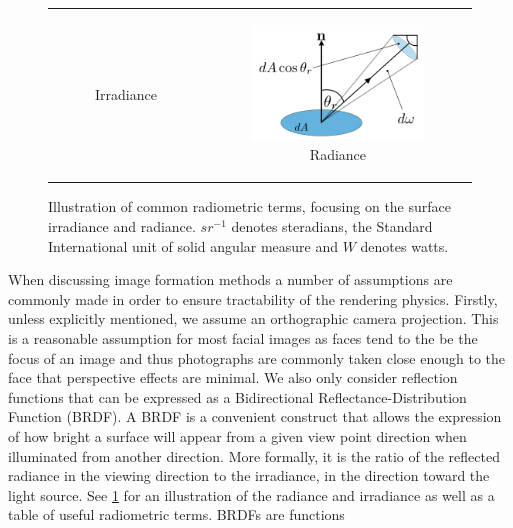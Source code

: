 \begin{figure}[t]
\begin{tabular}{cc}
\begin{subfigure}[b]{0.48\textwidth}
			\caption*{Irradiance}
		\end{subfigure} &
		\begin{subfigure}[b]{0.48\textwidth}
			\centering
			\includegraphics[width=\textwidth]{background/images/radiance}
			\caption*{Radiance}
		\end{subfigure}
	\end{tabular}
	\caption{Illustration of common radiometric terms, focusing on the surface
	         irradiance and radiance. ${sr}^{-1}$ denotes steradians, the
	         Standard International unit of solid angular measure and
	         $W$ denotes watts.}
\label{fig:bg_sfs_rad_irrad}
\end{figure}
When discussing image formation methods a number of assumptions are commonly
made in order to ensure tractability of the rendering physics. Firstly,
unless explicitly mentioned, we assume an orthographic camera projection. This
is a reasonable assumption for most facial images as faces tend to the be
the focus of an image and thus photographs are commonly taken close enough
to the face that perspective effects are minimal. We also only consider
reflection functions that can be expressed as a Bidirectional
Reflectance-Distribution Function (BRDF). A BRDF is a convenient construct
that allows the expression of how bright a surface will appear from a given
view point direction when illuminated from another direction. More formally, it
is the ratio of the reflected radiance in the viewing direction to the
irradiance, in the direction toward the light source.
See \cref{fig:bg_sfs_rad_irrad} for an illustration of the radiance and
irradiance as well as a table of useful radiometric terms. BRDFs are functions
